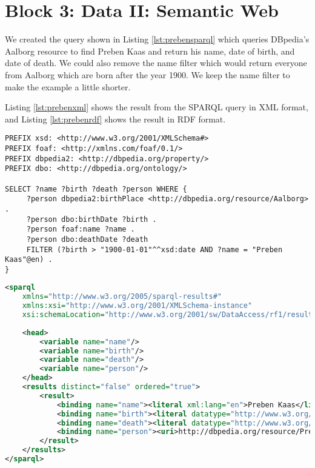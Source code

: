 \section{Block 3: Data II: Semantic Web}

We created the query shown in Listing \ref{lst:prebensparql} which queries DBpedia's Aalborg resource to find Preben Kaas and return his name, date of birth, and date of death. We could also remove the name filter which would return everyone from Aalborg which are born after the year 1900. We keep the name filter to make the example a little shorter.

Listing \ref{lst:prebenxml} shows the result from the SPARQL query in XML format, and Listing \ref{lst:prebenrdf} shows the result in RDF format.\\

\begin{lstlisting}[language=sparql, caption={SPARQL query}, label=lst:prebensparql] 
PREFIX xsd: <http://www.w3.org/2001/XMLSchema#>
PREFIX foaf: <http://xmlns.com/foaf/0.1/>
PREFIX dbpedia2: <http://dbpedia.org/property/>
PREFIX dbo: <http://dbpedia.org/ontology/>

SELECT ?name ?birth ?death ?person WHERE {
     ?person dbpedia2:birthPlace <http://dbpedia.org/resource/Aalborg> .
     ?person dbo:birthDate ?birth .
     ?person foaf:name ?name .
     ?person dbo:deathDate ?death
     FILTER (?birth > "1900-01-01"^^xsd:date AND ?name = "Preben Kaas"@en) .
}
\end{lstlisting}

\begin{lstlisting}[language=xml,label=lst:prebenxml, caption={XML from SPARQL query}] 
<sparql
    xmlns="http://www.w3.org/2005/sparql-results#"
    xmlns:xsi="http://www.w3.org/2001/XMLSchema-instance"
    xsi:schemaLocation="http://www.w3.org/2001/sw/DataAccess/rf1/result2.xsd">
    
    <head>
        <variable name="name"/>
        <variable name="birth"/>
        <variable name="death"/>
        <variable name="person"/>
    </head>
    <results distinct="false" ordered="true">
        <result>
            <binding name="name"><literal xml:lang="en">Preben Kaas</literal></binding>
            <binding name="birth"><literal datatype="http://www.w3.org/2001/XMLSchema#date">1930-03-30</literal></binding>
            <binding name="death"><literal datatype="http://www.w3.org/2001/XMLSchema#date">1981-03-27</literal></binding>
            <binding name="person"><uri>http://dbpedia.org/resource/Preben_Kaas</uri></binding>
        </result>
    </results>
</sparql>
\end{lstlisting}

